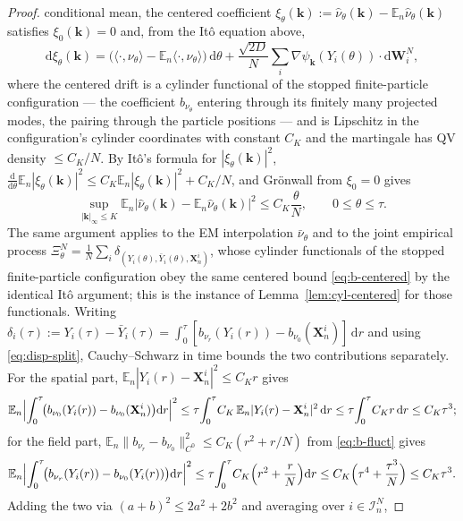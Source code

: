 \documentclass[a4paper,fleqn]{cas-sc}
\theoremstyle{definition}
\theoremstyle{remark}
\begin{document}
\begin{proof}
conditional mean, the centered coefficient
$\xi_\theta(\mathbf k):=\hat\nu_\theta(\mathbf k)-\mathbb E_n\hat\nu_\theta(\mathbf k)$
satisfies $\xi_0(\mathbf k)=0$ and, from the It\^o equation above,
\[
\mathrm d\xi_\theta(\mathbf k)
=\bigl(\langle\cdot,\nu_\theta\rangle-\mathbb E_n\langle\cdot,\nu_\theta\rangle\bigr)\,\mathrm d\theta
+\frac{\sqrt{2D}}N\sum_i\nabla\psi_{\mathbf k}(Y_i(\theta))\!\cdot\!\mathrm d\mathbf W^N_i,
\]
where the centered drift is a cylinder functional of the stopped finite-particle
configuration --- the coefficient $b_{\nu_\theta}$ entering through its finitely many
projected modes, the pairing through the particle positions --- and is Lipschitz in the
configuration's cylinder coordinates with constant
$C_K$ and the martingale has QV density $\le C_K/N$. By It\^o's formula for
$|\xi_\theta(\mathbf k)|^2$, $\frac{\mathrm d}{\mathrm d\theta}
\mathbb E_n|\xi_\theta(\mathbf k)|^2\le C_K\mathbb E_n|\xi_\theta(\mathbf k)|^2+C_K/N$,
and Gr\"onwall from $\xi_0=0$ gives
\begin{equation}\label{eq:b-centered}
\sup_{|\mathbf k|_\infty\le K}\mathbb E_n|\hat\nu_\theta(\mathbf k)-\mathbb E_n\hat\nu_\theta(\mathbf k)|^2
\le C_K\frac\theta N,
\qquad 0\le\theta\le\tau.
\end{equation}
The same argument applies to
the EM interpolation $\bar\nu_\theta$ and to the joint empirical process
$\Xi^N_\theta=\frac1N\sum_i\delta_{(Y_i(\theta),\bar Y_i(\theta),\mathbf X^i_n)}$,
whose cylinder functionals of the stopped finite-particle configuration obey the same centered bound
\eqref{eq:b-centered} by the identical It\^o argument; this is the instance of
Lemma~\ref{lem:cyl-centered} for those functionals.
Writing $\delta_i(\tau):=Y_i(\tau)-\bar Y_i(\tau)
=\int_0^\tau[b_{\nu_r}(Y_i(r))-b_{\nu_0}(\mathbf X^i_n)]\,\mathrm dr$ and using
\eqref{eq:disp-split}, Cauchy--Schwarz in time bounds the two contributions separately.
For the spatial part, $\mathbb E_n|Y_i(r)-\mathbf X^i_n|^2\le C_K r$ gives
\[
\mathbb E_n\Bigl|\int_0^\tau\!\bigl(b_{\nu_0}(Y_i(r))-b_{\nu_0}(\mathbf X^i_n)\bigr)\mathrm dr\Bigr|^2
\le\tau\!\int_0^\tau\! C_K\,\mathbb E_n|Y_i(r)-\mathbf X^i_n|^2\,\mathrm dr
\le\tau\!\int_0^\tau\! C_K r\,\mathrm dr\le C_K\tau^3;
\]
for the field part, $\mathbb E_n\|b_{\nu_r}-b_{\nu_0}\|_{C^0}^2\le C_K(r^2+r/N)$ from
\eqref{eq:b-fluct} gives
\[
\mathbb E_n\Bigl|\int_0^\tau\!\bigl(b_{\nu_r}(Y_i(r))-b_{\nu_0}(Y_i(r))\bigr)\mathrm dr\Bigr|^2
\le\tau\!\int_0^\tau\! C_K\Bigl(r^2+\frac rN\Bigr)\mathrm dr
\le C_K\Bigl(\tau^4+\frac{\tau^3}N\Bigr)\le C_K\tau^3 .
\]
Adding the two via $(a+b)^2\le2a^2+2b^2$ and averaging over $i\in\mathcal I^N_n$,

\end{proof}
\end{document}
